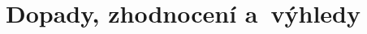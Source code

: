 \documentclass{book}
\begin{document}


\part{Dopady, zhodnocení a~výhledy}


\newpage \thispagestyle{empty} \mbox{} \newpage

\newpage \thispagestyle{empty} \mbox{} \newpage

\newpage \thispagestyle{empty} \mbox{} \newpage





%
% 



\printbibliography

\tableofcontents
\end{document}
